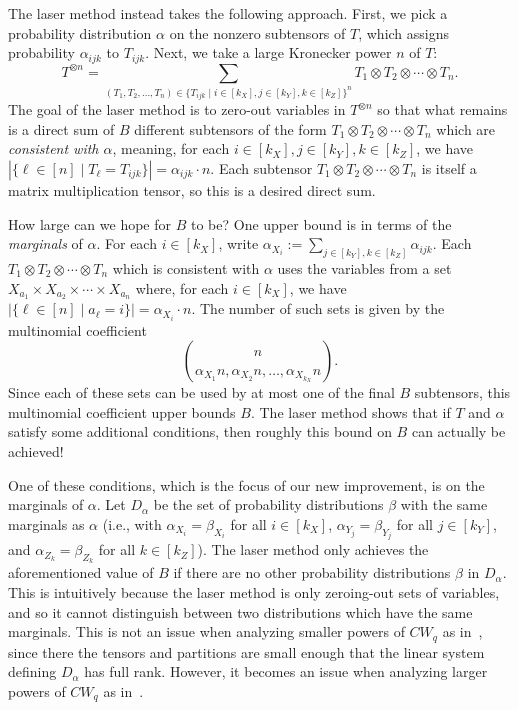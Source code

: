 \PassOptionsToPackage{shortlabels}{enumitem}\documentclass[10pt,a4paper]{article}
\begin{document}
The laser method instead takes the following approach. First, we pick a probability distribution $\alpha$ on the nonzero subtensors of $T$, which assigns probability $\alpha_{ijk}$ to $T_{ijk}$. Next, we take a large Kronecker power $n$ of $T$: $$T^{\otimes n} = \sum_{(T_1, T_2, \ldots, T_n) \in \{T_{ijk} \mid i \in [k_X], j \in [k_Y], k \in [k_Z]\}^n} T_1 \otimes T_2 \otimes \cdots \otimes T_n.$$ The goal of the laser method is to zero-out variables in $T^{\otimes n}$ so that what remains is a direct sum of $B$ different subtensors of the form $T_1 \otimes T_2 \otimes \cdots \otimes T_n$ which are \emph{consistent with $\alpha$}, meaning, for each $i \in [k_X], j \in [k_Y], k \in [k_Z]$, we have $|\{ \ell \in [n] \mid T_\ell = T_{ijk}\}| = \alpha_{ijk} \cdot n$. Each subtensor $T_1 \otimes T_2 \otimes \cdots \otimes T_n$ is itself a matrix multiplication tensor, so this is a desired direct sum. 

How large can we hope for $B$ to be? One upper bound is in terms of the \emph{marginals} of $\alpha$. For each $i \in [k_X]$, write $\alpha_{X_i} := \sum_{j \in [k_Y], k \in [k_Z]} \alpha_{ijk}$. Each $T_1 \otimes T_2 \otimes \cdots \otimes T_n$ which is consistent with $\alpha$ uses the variables from a set $X_{a_1} \times X_{a_2} \times \cdots \times X_{a_n}$ where, for each $i \in [k_X]$, we have $|\{ \ell \in [n] \mid a_\ell = i\}| = \alpha_{X_i} \cdot n$. The number of such sets is given by the multinomial coefficient $$\binom{n}{\alpha_{X_1}n, \alpha_{X_2}n, \ldots, \alpha_{X_{k_X}}n}.$$
Since each of these sets can be used by at most one of the final $B$ subtensors, this multinomial coefficient upper bounds $B$. The laser method shows that if $T$ and $\alpha$ satisfy some additional conditions, then roughly this bound on $B$ can actually be achieved!

One of these conditions, which is the focus of our new improvement, is on the marginals of $\alpha$. Let $D_\alpha$ be the set of probability distributions $\beta$ with the same marginals as $\alpha$ (i.e., with $\alpha_{X_i} = \beta_{X_i}$ for all $i \in [k_X]$, $\alpha_{Y_j} = \beta_{Y_j}$ for all $j \in [k_Y]$, and $\alpha_{Z_k} = \beta_{Z_k}$ for all $k \in [k_Z]$). The laser method only achieves the aforementioned value of $B$ if there are no other probability distributions $\beta$ in $D_\alpha$. This is intuitively because the laser method is only zeroing-out sets of variables, and so it cannot distinguish between two distributions which have the same marginals. This is not an issue when analyzing smaller powers of $CW_q$ as in~\cite{coppersmith,stothers}, since there the tensors and partitions are small enough that the linear system defining $D_\alpha$ has full rank. However, it becomes an issue when analyzing larger powers of $CW_q$ as in~\cite{v12,legall}.
\end{document}
